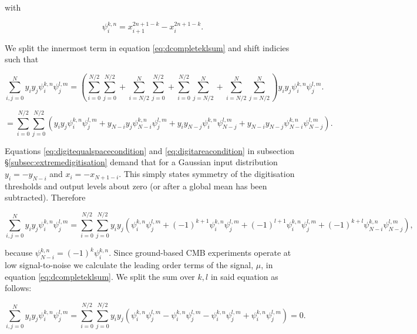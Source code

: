 \documentclass[apj]{emulateapj}
\begin{document}
with

\begin{equation}
\psi_i^{k,n} = x_{i+1}^{2n+1-k} - x_{i}^{2n+1-k}.
\end{equation}

We split the innermost term in equation \ref{eq:dcompleteklsum} and shift indicies such that

\begin{equation}
\sum_{i,j = 0}^N y_i y_j \psi_i^{k, n} \psi_j^{l, m} = \left( \sum_{i = 0}^{N/2}\sum_{j = 0}^{N/2} + \sum_{i = N/2}^{N}\sum_{j = 0}^{N/2} + \sum_{i = 0}^{N/2}\sum_{j = N/2}^{N} + \sum_{i = N/2}^{N}\sum_{j = N/2}^{N} \right) y_i y_j \psi_i^{k, n} \psi_j^{l, m}.
\end{equation}

\begin{equation}
= \sum_{i = 0}^{N/2}\sum_{j = 0}^{N/2} \left( y_i y_j \psi_i^{k, n} \psi_j^{l, m} +  y_{N-i} y_j \psi_{N-i}^{k, n} \psi_j^{l, m} + y_i y_{N-j} \psi_i^{k, n} \psi_{N-j}^{l, m} + y_{N-i} y_{N-j} \psi_{N-i}^{k, n} \psi_{N-j}^{l, m} \right).
\end{equation}

Equations \ref{eq:digitequalspacecondition} and \ref{eq:digitareacondition} in subsection \S\ref{subsec:extremedigitisation} demand that for a Gaussian input distribution $y_i = -y_{N-i}$ and $x_i = -x_{N+1-i}$. This simply states symmetry of the digitisation thresholds and output levels about zero (or after a global mean has been subtracted). Therefore

\begin{equation} \label{eq:ijsumpsiflip}
\sum_{i,j = 0}^N y_i y_j \psi_i^{k, n} \psi_j^{l, m} = \sum_{i = 0}^{N/2}\sum_{j = 0}^{N/2} y_i y_j \left( \psi_i^{k, n} \psi_j^{l, m} + (-1)^{k+1} \psi_{i}^{k, n} \psi_j^{l, m} + (-1)^{l+1} \psi_i^{k, n} \psi_{j}^{l, m} + (-1)^{k+l} \psi_{N-i}^{k, n} \psi_{N-j}^{l, m} \right),
\end{equation}

because $\psi_{N-i}^{k,n} = (-1)^{k} \psi_{i}^{k,n}$. Since ground-based CMB experiments operate at low signal-to-noise we calculate the leading order terms of the signal, $\mu$, in equation \ref{eq:dcompleteklsum}. We split the sum over $k, l$ in said equation as follows:

\begin{equation}
\sum_{i,j = 0}^N y_i y_j \psi_i^{k, n} \psi_j^{l, m} = \sum_{i = 0}^{N/2}\sum_{j = 0}^{N/2} y_i y_j  \left( \psi_i^{k, n} \psi_j^{l, m} - \psi_{i}^{k, n} \psi_j^{l, m} - \psi_i^{k, n} \psi_{j}^{l, m} + \psi_{i}^{k, n} \psi_{j}^{l, m} \right) = 0 .
\end{equation}
\end{document}
